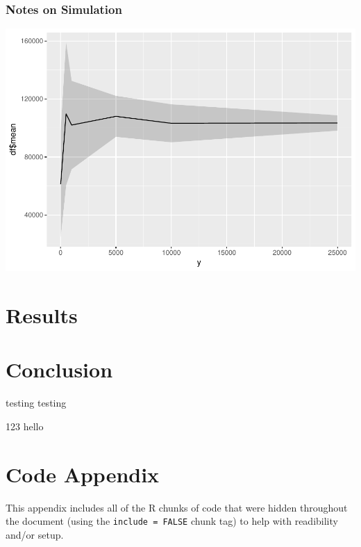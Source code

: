 \documentclass[12pt,twoside]{dukestatscithesis}
\theoremstyle{definition}
\theoremstyle{definition}
\theoremstyle{definition}
\theoremstyle{remark}
\begin{document}
\subsection{Notes on Simulation}\label{notes-on-simulation}

\includegraphics{thesis_files/figure-latex/unnamed-chunk-5-1.pdf}

\chapter{Results}\label{organization}

\chapter*{Conclusion}\label{conclusion}

testing testing

123 hello

\appendix

\chapter{Code Appendix}\label{code-appendix}

This appendix includes all of the R chunks of code that were hidden
throughout the document (using the \texttt{include\ =\ FALSE} chunk tag)
to help with readibility and/or setup.
\end{document}
